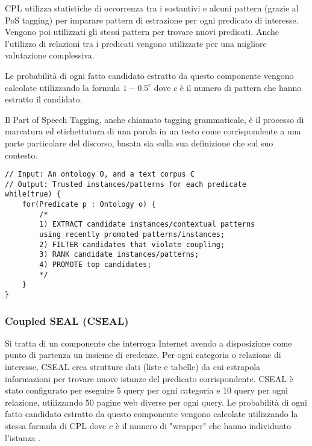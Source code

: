 \noindent CPL utilizza statistiche di occorrenza tra i sostantivi e alcuni pattern (grazie al PoS tagging) per imparare pattern di estrazione per ogni predicato di interesse. Vengono poi utilizzati gli stessi pattern per trovare nuovi predicati.
Anche l'utilizzo di relazioni tra i predicati vengono utilizzate per una migliore valutazione complessiva.

\noindent Le probabilità di ogni fatto candidato estratto da questo componente vengono calcolate utilizzando la formula $1 - 0.5^{c}$ dove $c$ è il numero di pattern che hanno estratto il candidato\cite{TowardAnArchitecture:online}.
\begin{info}
	Il Part of Speech Tagging, anche chiamato tagging grammaticale, è il processo di marcatura ed etichettatura di una parola in un testo come corrispondente a una parte particolare del discorso, basata sia sulla sua definizione che sul suo contesto\cite{POStagsa85:online}.
\end{info}

\begin{code}
\begin{verbatim}
// Input: An ontology O, and a text corpus C 
// Output: Trusted instances/patterns for each predicate
while(true) {
	for(Predicate p : Ontology o) {
		/*
		1) EXTRACT candidate instances/contextual patterns 
		using recently promoted patterns/instances;
		2) FILTER candidates that violate coupling;
		3) RANK candidate instances/patterns;
		4) PROMOTE top candidates;
		*/
	}
}
\end{verbatim}
\end{code}

\subsubsection{Coupled SEAL (CSEAL)}
Si tratta di un componente che interroga Internet avendo a disposizione come punto di partenza  un insieme di credenze. Per ogni categoria o relazione di interesse, CSEAL crea strutture dati (liste e tabelle) da cui estrapola informazioni per trovare nuove istanze del predicato corrispondente. CSEAL è stato configurato per eseguire 5 query per ogni categoria e 10 query per ogni relazione, utilizzando 50 pagine web diverse per ogni query.
Le probabilità di ogni fatto candidato estratto da questo componente vengono calcolate utilizzando la stessa formula di CPL dove $c$ è il numero di "wrapper" che hanno individuato l'istanza \cite{TowardAnArchitecture:online}.
